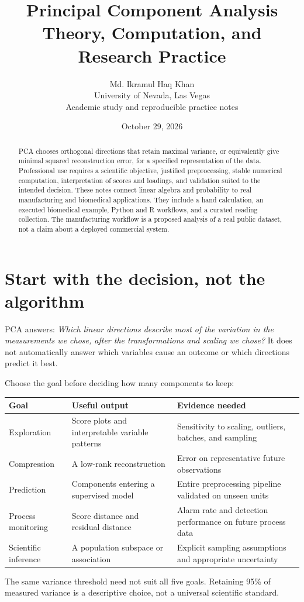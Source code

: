 \documentclass[11pt]{article}
\title{\color{ink}Principal Component Analysis\\Theory, Computation, and Research Practice}
\author{Md. Ikramul Haq Khan\\University of Nevada, Las Vegas\\Academic study and reproducible practice notes}
\date{October 29, 2026}
\begin{document}
\maketitle
\begin{abstract}
PCA chooses orthogonal directions that retain maximal variance, or equivalently give minimal squared reconstruction error, for a specified representation of the data. Professional use requires a scientific objective, justified preprocessing, stable numerical computation, interpretation of scores and loadings, and validation suited to the intended decision. These notes connect linear algebra and probability to real manufacturing and biomedical applications. They include a hand calculation, an executed biomedical example, Python and R workflows, and a curated reading collection. The manufacturing workflow is a proposed analysis of a real public dataset, not a claim about a deployed commercial system.
\end{abstract}
\tableofcontents\newpage
\section{Start with the decision, not the algorithm}
PCA answers: \emph{Which linear directions describe most of the variation in the measurements we chose, after the transformations and scaling we chose?} It does not automatically answer which variables cause an outcome or which directions predict it best.

Choose the goal before deciding how many components to keep:
\begin{center}\begin{tabular}{p{.20\linewidth}p{.35\linewidth}p{.36\linewidth}}\toprule
Goal & Useful output & Evidence needed\\\midrule
Exploration & Score plots and interpretable variable patterns & Sensitivity to scaling, outliers, batches, and sampling\\
Compression & A low-rank reconstruction & Error on representative future observations\\
Prediction & Components entering a supervised model & Entire preprocessing pipeline validated on unseen units\\
Process monitoring & Score distance and residual distance & Alarm rate and detection performance on future process data\\
Scientific inference & A population subspace or association & Explicit sampling assumptions and appropriate uncertainty\\\bottomrule
\end{tabular}\end{center}
The same variance threshold need not suit all five goals. Retaining 95\% of measured variance is a descriptive choice, not a universal scientific standard.
\end{document}
